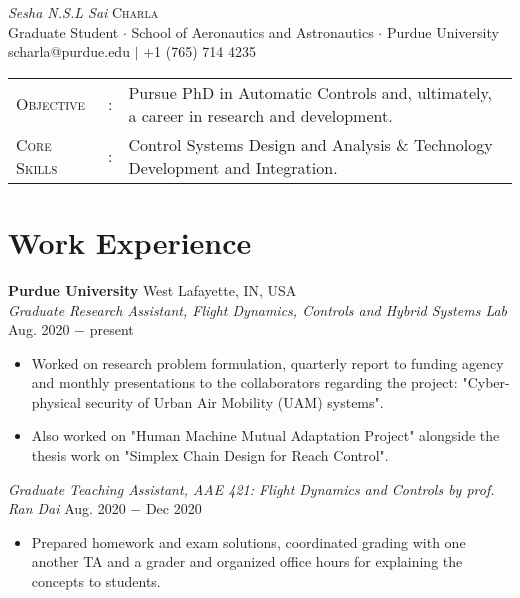 \documentclass[letterpaper,10pt]{article}
\begin{document}
\begin{center}
\thispagestyle{empty}
\huge{\textit{Sesha N.S.L Sai} \textsc{Charla}}\\
\small Graduate Student $\cdot$ School of Aeronautics and Astronautics $\cdot$ Purdue University\\
\small scharla@purdue.edu $\mid$ +1 (765) 714 4235   \\
\end{center}



\begin{tabular}{l c l}
	{\large{\textsc{Objective}}}&:&Pursue PhD in Automatic Controls and, ultimately, a career in research and development.\\
	{\large{\textsc{Core Skills}}}&:& Control Systems Design and Analysis \& Technology Development and Integration. %
\end{tabular}


\section{Work Experience} 
\noindent \textbf{Purdue University} \hfill West Lafayette, IN, USA \\
\noindent \textit{Graduate Research Assistant, Flight Dynamics, Controls and Hybrid Systems Lab} \hfill Aug. 2020 $-$ present
\begin{itemize}[noitemsep,nolistsep,leftmargin=0.25in,label={--}]
    \item Worked on research problem formulation, quarterly report to funding agency and monthly presentations to the collaborators regarding the project: "Cyber-physical security of Urban Air Mobility (UAM) systems".
    \item Also worked on "Human Machine Mutual Adaptation Project" alongside the thesis work on "Simplex Chain Design for Reach Control".
\end{itemize}

\vspace{3pt}
\noindent \textit{Graduate Teaching Assistant, AAE 421: Flight Dynamics and Controls by prof. Ran Dai} \hfill Aug. 2020 $-$ Dec 2020
\begin{itemize}[noitemsep,nolistsep,leftmargin=0.25in,label={--}]
    \item Prepared homework and exam solutions, coordinated grading with one another TA and a grader and organized office hours for explaining the concepts to students.
\end{itemize}
\end{document}
